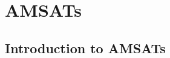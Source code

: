 \documentclass{tufte-book}
\begin{document}







\chapter{AMSATs\label{chap:amsats}}

\section{Introduction to AMSATs}
\end{document}
